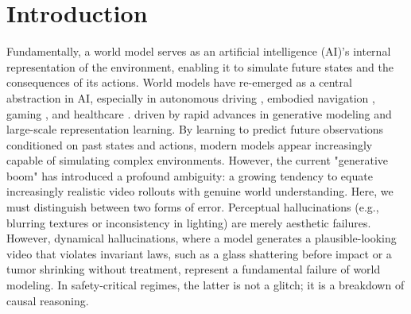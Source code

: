 \documentclass[pdflatex,sn-mathphys-num]{sn-jnl}
\theoremstyle{thmstyleone}%
\theoremstyle{thmstyletwo}%
\theoremstyle{thmstylethree}%
\begin{document}



\maketitle

\section{Introduction}\label{sec1}

Fundamentally, a world model serves as an artificial intelligence (AI)'s internal representation of the environment, enabling it to simulate future states and the consequences of its actions. World models \citep{ha2018world, matsuo2022deep, zhou2025hermes} have re-emerged as a central abstraction in AI, especially in autonomous driving \citep{wang2024driving, bogdoll2025muvo}, embodied navigation \citep{nie2025wmnav, bar2025navigation}, gaming \citep{ying2025assessing}, and healthcare \citep{mewm}. driven by rapid advances in generative modeling and large-scale representation learning. By learning to predict future observations conditioned on past states and actions, modern models appear increasingly capable of simulating complex environments. However, the current "generative boom" has introduced a profound ambiguity: a growing tendency to equate increasingly realistic video rollouts with genuine world understanding. Here, we must distinguish between two forms of error. Perceptual hallucinations (e.g., blurring textures or inconsistency in lighting) are merely aesthetic failures. However, dynamical hallucinations, where a model generates a plausible-looking video that violates invariant laws, such as a glass shattering before impact or a tumor shrinking without treatment, represent a fundamental failure of world modeling. In safety-critical regimes, the latter is not a glitch; it is a breakdown of causal reasoning.
\end{document}
